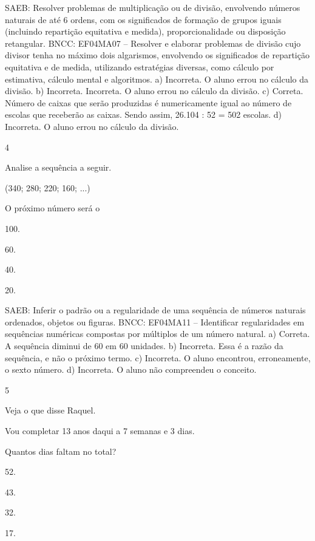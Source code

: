\begin{mdframed}[linewidth=2pt,linecolor=salmao,roundcorner=2pt]
\begin{escolha}
{\begin{escolha}
SAEB: Resolver problemas de multiplicação ou de divisão,
envolvendo números naturais de até 6 ordens, com os significados de
formação de grupos iguais (incluindo repartição equitativa e medida),
proporcionalidade ou disposição retangular.
BNCC: EF04MA07 -- Resolver e elaborar problemas de divisão cujo divisor tenha no máximo dois algarismos,
envolvendo os significados de repartição equitativa e de medida, utilizando estratégias diversas,
como cálculo por estimativa, cálculo mental e algoritmos.
a) Incorreta. O aluno errou no cálculo da divisão.
b) Incorreta. Incorreta. O aluno errou no cálculo da divisão.
c) Correta. Número de caixas que serão produzidas é numericamente igual ao número de
escolas que receberão as caixas. Sendo assim, 26.104 : 52 = 502 escolas.
d) Incorreta. O aluno errou no cálculo da divisão.

\num{4}

Analise a sequência a seguir.

(340; 280; 220; 160; ...)

 O próximo número será o

\begin{escolha}
\item
  100.
\item
  60.
\item
  40.
\item
  20.
\end{escolha}

SAEB: Inferir o padrão ou a regularidade de uma sequência de
números naturais ordenados, objetos ou figuras.
BNCC: EF04MA11 -- Identificar regularidades em sequências numéricas compostas por múltiplos de um
número natural.
a) Correta. A sequência diminui de 60 em 60 unidades.
b) Incorreta. Essa é a razão da sequência, e não o próximo termo.
c) Incorreta. O aluno encontrou, erroneamente, o sexto número.
d) Incorreta. O aluno não compreendeu o conceito.

\num{5}

Veja o que disse Raquel.

Vou completar 13 anos daqui a 7 semanas e 3 dias.

Quantos dias faltam no total?

\begin{escolha}
\item
  52.
\item
  43.
\item
  32.
\item
  17.
\end{escolha}


\end{escolha}}
\end{escolha}
\end{mdframed}
